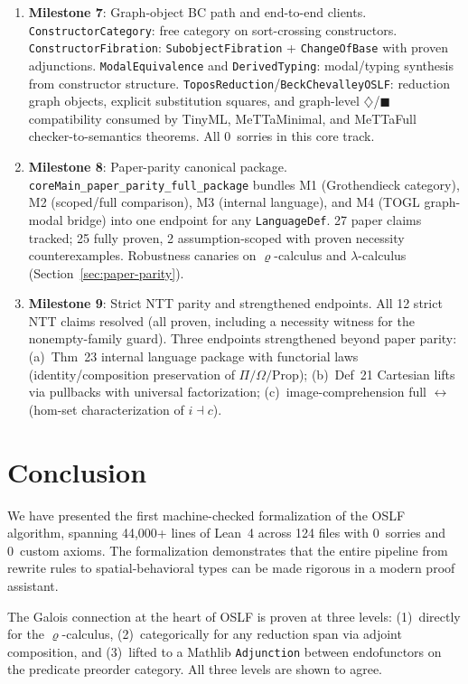 \documentclass[]{article}
\newcommand{\code}[1]{\texttt{#1}}
\newcommand{\rhocalc}{\ensuremath{\varrho}}
\newcommand{\Dia}{\ensuremath{\diamondsuit}}
\newcommand{\Bx}{\ensuremath{\blacksquare}}
\newcommand{\OSLF}{\textup{OSLF}}
\begin{document}
\begin{enumerate}
\item[\checkmark] \textbf{Milestone 7}: Graph-object BC path and end-to-end clients.
  \code{ConstructorCategory}: free category on sort-crossing constructors.
  \code{ConstructorFibration}: \code{SubobjectFibration} + \code{ChangeOfBase}
  with proven adjunctions.
  \code{ModalEquivalence} and \code{DerivedTyping}: modal/typing synthesis from
  constructor structure.
  \code{ToposReduction}/\code{BeckChevalleyOSLF}: reduction graph objects, explicit
  substitution squares, and graph-level $\Dia$/$\Bx$ compatibility consumed by
  TinyML, MeTTaMinimal, and MeTTaFull checker-to-semantics theorems.
  All 0~sorries in this core track.

\item[\checkmark] \textbf{Milestone 8}: Paper-parity canonical package.
  \code{coreMain\_paper\_parity\_full\_package} bundles M1 (Grothendieck
  category), M2 (scoped/full comparison), M3 (internal language), and M4
  (TOGL graph-modal bridge) into one endpoint for any \code{LanguageDef}.
  27 paper claims tracked; 25 fully proven, 2 assumption-scoped with proven
  necessity counterexamples.  Robustness canaries on \rhocalc{}-calculus and
  $\lambda$-calculus (Section~\ref{sec:paper-parity}).

\item[\checkmark] \textbf{Milestone 9}: Strict NTT parity and strengthened endpoints.
  All 12 strict NTT claims resolved (all proven, including a necessity
  witness for the nonempty-family guard).  Three endpoints strengthened
  beyond paper parity:
  (a)~Thm~23 internal language package with functorial laws (identity/composition preservation of
  $\Pi/\Omega/\mathrm{Prop}$);
  (b)~Def~21 Cartesian lifts via pullbacks with universal factorization;
  (c)~image-comprehension full $\leftrightarrow$ (hom-set characterization
  of $i \dashv c$).
\end{enumerate}

\section{Conclusion}

We have presented the first machine-checked formalization of the \OSLF{} algorithm,
spanning 44{,}000+ lines of Lean~4 across 124 files with 0~sorries and 0~custom axioms.
The formalization demonstrates that the entire pipeline from rewrite rules to
spatial-behavioral types can be made rigorous in a modern proof assistant.

The Galois connection at the heart of \OSLF{} is proven at three levels:
(1)~directly for the \rhocalc{}-calculus, (2)~categorically for any reduction span via
adjoint composition, and (3)~lifted to a Mathlib \code{Adjunction} between endofunctors
on the predicate preorder category.  All three levels are shown to agree.
\end{document}
